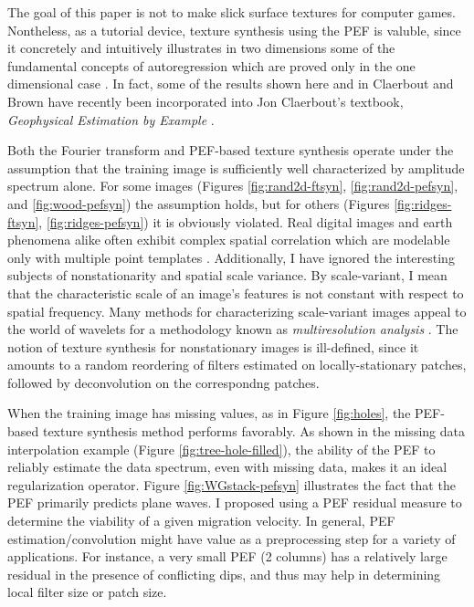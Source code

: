 	The goal of this paper is not to make slick surface textures for computer games.
	Nontheless, as a tutorial device, texture synthesis using the PEF is valuble, since
	it concretely and intuitively illustrates in two dimensions some of the fundamental 
	concepts of autoregression which are proved only in the one dimensional case 
	{\small \cite{fgdp}}.  In fact, some of the results shown here and in Claerbout and Brown 
	{\small {}} have recently been incorporated into Jon Claerbout's 
	textbook, {\em Geophysical Estimation by Example} {\small {}}.  

	\par
	Both the Fourier transform and PEF-based texture synthesis operate under the assumption
	that the training image is sufficiently well characterized by amplitude spectrum alone.
	For some images (Figures \ref{fig:rand2d-ftsyn}, \ref{fig:rand2d-pefsyn}, and 
	\ref{fig:wood-pefsyn}) the assumption holds, but for others (Figures \ref{fig:ridges-ftsyn},
	\ref{fig:ridges-pefsyn}) it is obviously violated.  Real digital images and earth
	phenomena alike often exhibit complex spatial correlation which are modelable only with
	multiple point templates  {\small \cite{caers-journel, malzbender-spach}}.  Additionally, 
	I have ignored the 
	interesting subjects of nonstationarity and spatial scale variance.  By scale-variant,
	I mean that the characteristic scale of an image's features is not constant with
	respect to spatial frequency.  Many methods for characterizing scale-variant images 
	appeal 
	to the world of wavelets for a methodology known as {\em multiresolution analysis}
	{\small \cite{simoncelli, heeger, strang}}.  The notion of texture synthesis for nonstationary
	images is ill-defined, since it amounts to a random reordering of filters estimated on
	locally-stationary patches, followed by deconvolution on the correspondng patches.

	\par
	When the training image has missing values, as in Figure \ref{fig:holes}, the PEF-based
	texture synthesis method performs favorably.  As shown in the missing data interpolation
	example (Figure \ref{fig:tree-hole-filled}), the ability of the PEF to reliably estimate
	the data spectrum, even with missing data, makes it an ideal regularization operator.
	Figure \ref{fig:WGstack-pefsyn} illustrates the fact that the PEF primarily predicts plane
	waves.  I proposed using a PEF residual measure to determine the viability of a given
	migration velocity.  In general, PEF estimation/convolution might have value as a 
	preprocessing step for a variety of applications.  For instance, a very small PEF
	(2 columns) has a relatively large residual in the presence of conflicting dips, and 
	thus may help in determining local filter size or patch size. 

